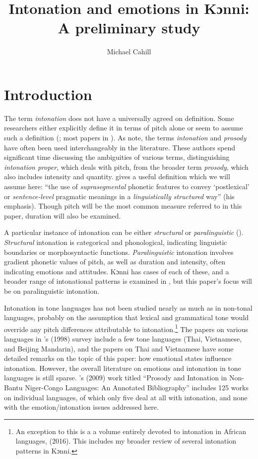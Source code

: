 \documentclass[output=paper]{langsci/langscibook}
\title{Intonation and emotions in Kɔnni: A preliminary study}
\author{%
 Michael Cahill\affiliation{SIL International} 
}
\begin{document}
\section{Introduction}
The term \emph{intonation} does not have a universally agreed on definition. Some researchers either explicitly define it in terms of pitch alone or seem to assume such a definition (\citealt{lieberman1967}; most papers in \citealt{bolinger1972,gussenhoven2004}). As \citet[3]{hirstdicristo1998} note, the terms \emph{intonation} and \emph{prosody} have often been used interchangeably in the literature. These authors spend significant time discussing the ambiguities of various terms, distinguishing \emph{intonation proper}, which deals with pitch, from the broader term \emph{prosody}, which also includes intensity and quantity. \citet[4]{ladd2008} gives a useful definition which we will assume here: ``the use of \emph{suprasegmental} phonetic features to convey `postlexical' or \emph{sentence-level} pragmatic meanings in a \emph{linguistically structured} way'' (his emphasis). Though pitch will be the most common measure referred to in this paper, duration will also be examined. 

A particular instance of intonation can be either \emph{structural} or \emph{paralinguistic} (\citealt{gussenhoven2004,laddetal1986,ladd2008}). 
\emph{Structural} intonation is categorical and phonological, indicating linguistic boundaries or morphosyntactic functions. \emph{Paralinguistic} intonation involves gradient phonetic values of pitch, as well as duration and intensity, often indicating emotions and attitudes. Kɔnni has cases of each of these, and a broader range of intonational patterns 
is examined in \citet{cahill2016intonation}, but this paper's focus will be on paralinguistic intonation.

Intonation in tone languages has not been studied nearly as much as in non-tonal languages, probably on the assumption that lexical and grammatical tone would override any pitch differences attributable to intonation.\footnote{An exception to this is a a volume entirely devoted to intonation in African languages, \citeauthor{downingrialland2016} (2016). This includes my broader review of several intonation patterns in Kɔnni.} The papers on various languages in \citeauthor{hirstdicristo1998}'s (1998) survey include a few tone languages (Thai, Vietnamese, and Beijing Mandarin), and the papers on Thai and Vietnamese have some detailed remarks on the topic of this paper: how emotional states influence intonation. However, the overall literature on emotions and intonation in tone languages is still sparse. \citeauthor{green2009}'s (2009) work titled ``Prosody and Intonation in Non-Bantu Niger-Congo Languages: An Annotated Bibliography'' includes 125 works on individual languages, of which only five deal at all with intonation, and none with the emotion/intonation issues addressed here. 
\end{document}
